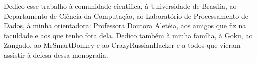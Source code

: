 Dedico esse trabalho à comunidade científica, à Universidade de Brasília, ao Departamento de Ciência da Computação, ao Laboratório de Processamento de Dados, à minha orientadora: Professora Doutora Aletéia, aos amigos que fiz na faculdade e aos que tenho fora dela. Dedico também à minha família, à Goku, ao Zangado, ao MrSmartDonkey e ao CrazyRussianHacker e a todos que vieram assistir à defesa dessa monografia.